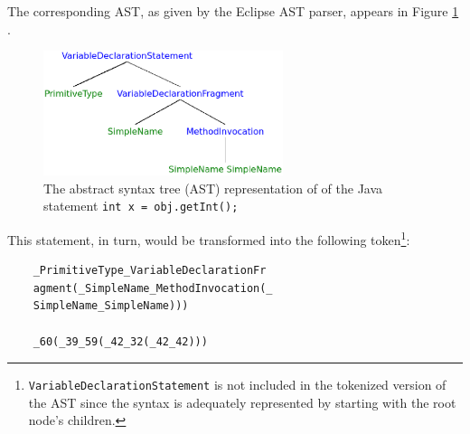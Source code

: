 \documentclass[runningheads,a4paper]{llncs}
\begin{document}
The corresponding AST, as given by the Eclipse AST parser, appears in Figure \ref{ast-figure} \cite{Eclipse}.

\begin{figure}[ht]
\vskip 0.2in
\begin{center}
\centerline{\includegraphics[width=70mm]{ast.eps}}
\caption{The abstract syntax tree (AST) representation of of the Java statement
\texttt{int x = obj.getInt();}}
\label{ast-figure}
\end{center}
\vskip -0.2in
\end{figure} 

This statement, in turn, would be transformed into the following token\footnote{
\texttt{VariableDeclarationStatement} is not included in the
tokenized version of the AST since the syntax is adequately represented
by starting with the root node's children.}:


\begin{verbatim}
    _PrimitiveType_VariableDeclarationFr
    agment(_SimpleName_MethodInvocation(_
    SimpleName_SimpleName)))

    _60(_39_59(_42_32(_42_42)))
\end{verbatim}

\end{document}
